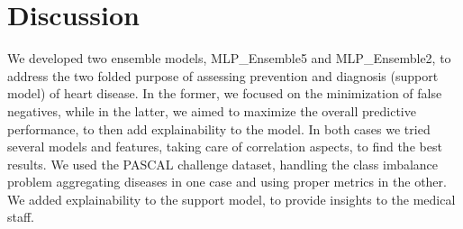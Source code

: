 \section{Discussion}

We developed two ensemble models, MLP\_Ensemble5 and MLP\_Ensemble2, to address the two folded 
purpose of assessing prevention and diagnosis (support model) of heart disease. In the former, we focused 
on the minimization of false negatives, while in the latter, we aimed to maximize the 
overall predictive performance, to then add explainability to the model.
In both cases we tried several models and features, taking care of correlation aspects, 
to find the best results. We used the PASCAL challenge dataset, handling the class imbalance
problem aggregating diseases in one case and using proper metrics in the other.
We added explainability to the support model, to provide insights to the medical staff.

